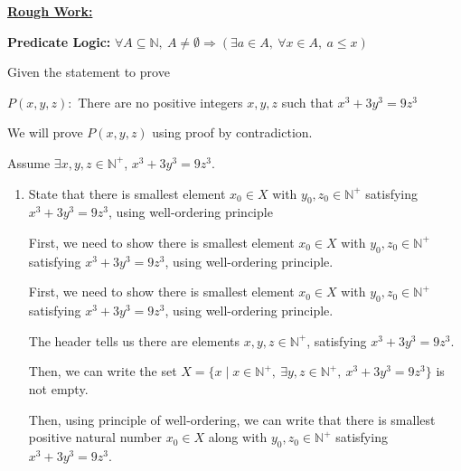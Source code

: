 \documentclass[12pt]{article}
\begin{document}
\begin{mdframed}
    \underline{\textbf{Rough Work:}}

    \bigskip

    \textbf{Predicate Logic:} $\forall A \subseteq \mathbb{N},\:A \neq \emptyset \Rightarrow
    (\exists a \in A, \: \forall x \in A,\: a \leq x)$

    \bigskip

    Given the statement to prove

    \bigskip

    \begin{center}
        $P(x,y,z):$ There are no positive integers $x,y,z$ such that $x^3 + 3y^3 = 9z^3$
    \end{center}

    \bigskip

    We will prove $P(x,y,z)$ using proof by contradiction.

    \bigskip

    Assume $\exists x,y,z \in \mathbb{N}^{+}$, $x^3 + 3y^3 = 9z^3$.

    \begin{enumerate}[1.]

        \item State that there is smallest element $x_0 \in X$ with $y_0,z_0 \in \mathbb{N}^+$
        satisfying $x^3 + 3y^3 = 9z^3$, using well-ordering principle

        \bigskip

        First, we need to show there is smallest element $x_0 \in X$ with $y_0,z_0 \in \mathbb{N}^+$
        satisfying $x^3 + 3y^3 = 9z^3$, using well-ordering principle.

        \bigskip

        \begin{mdframed}
        First, we need to show there is smallest element $x_0 \in X$ with $y_0,z_0 \in \mathbb{N}^+$
        satisfying $x^3 + 3y^3 = 9z^3$, using well-ordering principle.

        \bigskip

        The header tells us there are elements $x,y,z \in \mathbb{N}^+$, satisfying
        $x^3 + 3y^3 = 9z^3$.

        \bigskip

        Then, we can write the set $X = \{x \mid x \in \mathbb{N}^+,\:\exists y,z \in
        \mathbb{N}^+,\:x^3 + 3y^3 = 9z^3\}$ is not empty.

        \bigskip

        Then, using principle of well-ordering, we can write that there is smallest
        positive natural number $x_0 \in X$ along with $y_0,z_0 \in \mathbb{N}^+$ satisfying
        $x^3 + 3y^3 = 9z^3$.
        \end{mdframed}


\end{enumerate}
\end{mdframed}
\end{document}

